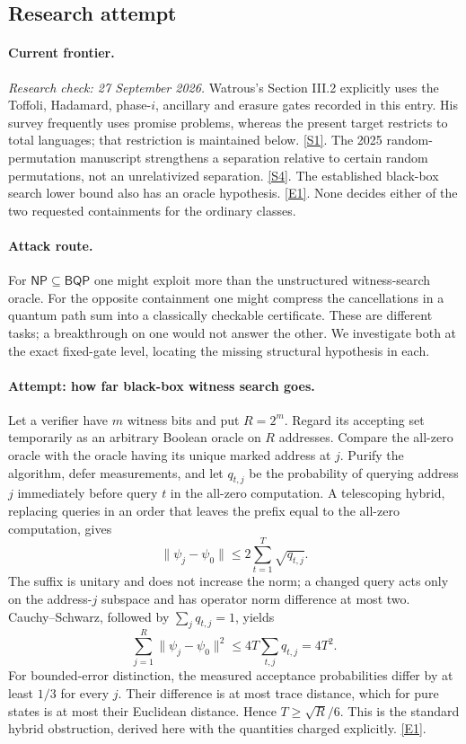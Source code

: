 \documentclass[11pt,a4paper]{article}
\newcommand{\sref}[2]{\hyperlink{source:#1:#2}{[S#2]}}
\newcommand{\eref}[2]{\hyperlink{extra:#1:#2}{[E#2]}}
\begin{document}
\subsection{Research attempt}
\paragraph{Current frontier.}
\textit{Research check: 27 September 2026.}
Watrous's Section III.2 explicitly uses the Toffoli, Hadamard, phase-$i$,
ancillary and erasure gates recorded in this entry. His survey frequently
uses promise problems, whereas the present target restricts to total
languages; that restriction is maintained below. \sref{30006681}{1}.
The 2025 random-permutation manuscript strengthens a separation relative
to certain random permutations, not an unrelativized separation.
\sref{30006681}{4}. The established black-box search lower bound also has an
oracle hypothesis. \eref{30006681}{1}. None decides either of the two requested
containments for the ordinary classes.

\paragraph{Attack route.}
For $\mathsf{NP}\subseteq\mathsf{BQP}$ one might exploit more than the
unstructured witness-search oracle. For the opposite containment one might
compress the cancellations in a quantum path sum into a classically
checkable certificate. These are different tasks; a breakthrough on one
would not answer the other. We investigate both at the exact fixed-gate
level, locating the missing structural hypothesis in each.

\paragraph{Attempt: how far black-box witness search goes.}
Let a verifier have $m$ witness bits and put $R=2^m$. Regard its accepting
set temporarily as an arbitrary Boolean oracle on $R$ addresses. Compare
the all-zero oracle with the oracle having its unique marked address at
$j$. Purify the algorithm, defer measurements, and let $q_{t,j}$ be the
probability of querying address $j$ immediately before query $t$ in the
all-zero computation. A telescoping hybrid, replacing queries in an order
that leaves the prefix equal to the all-zero computation, gives
\[
 \|\psi_j-\psi_0\|\leq2\sum_{t=1}^T\sqrt{q_{t,j}}.
\]
The suffix is unitary and does not increase the norm; a changed query
acts only on the address-$j$ subspace and has operator norm difference
at most two. Cauchy--Schwarz, followed by $\sum_jq_{t,j}=1$, yields
\[
 \sum_{j=1}^R\|\psi_j-\psi_0\|^2\leq4T\sum_{t,j}q_{t,j}=4T^2.
 \tag{16.1}
\]
For bounded-error distinction, the measured acceptance probabilities differ
by at least $1/3$ for every $j$. Their difference is at most trace distance,
which for pure states is at most their Euclidean distance. Hence
$T\geq\sqrt R/6$. This is the standard hybrid obstruction, derived here
with the quantities charged explicitly. \eref{30006681}{1}.
\end{document}
